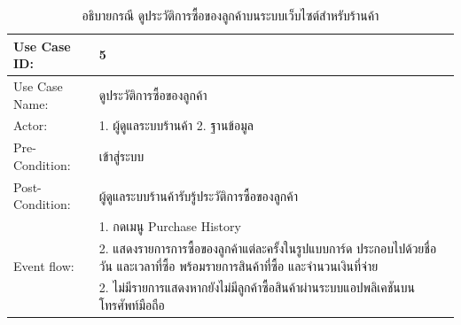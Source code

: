 \begin{table}[htbp]
  \centering
  \caption{อธิบายกรณี ดูประวัติการซื้อของลูกค้าบนระบบเว็บไซต์สำหรับร้านค้า}
  \begin{tabularx}{\textwidth}{|p{3cm}|X|}
    \hline
    \multirow{1}{3cm}{Use Case ID:}      & 5                                                                                                        \\
    \hline
    \multirow{1}{3cm}{Use Case Name:}    & ดูประวัติการซื้อของลูกค้า                                                                                       \\
    \hline
    \multirow{1}{3cm}{Actor:}            & 1. ผู้ดูแลระบบร้านค้า  2. ฐานข้อมูล                                                                             \\
    \hline
    \multirow{1}{3cm}{Pre-Condition:}    & เข้าสู่ระบบ                                                                                                 \\
    \hline
    \multirow{1}{3cm}{Post-Condition:}   & ผู้ดูแลระบบร้านค้ารับรู้ประวัติการซื้อของลูกค้า                                                                        \\
    \hline
    \multirow{3}{3cm}{Event flow:}       & 1. กดเมนู Purchase History                                                                                \\
                                         & 2. แสดงรายการการซื้อของลูกค้าแต่ละครั้งในรูปแบบการ์ด ประกอบไปด้วยชื่อ วัน และเวลาที่ซื้อ พร้อมรายการสินค้าที่ซื้อ และจำนวนเงินที่จ่าย \\
    \hline
    \multirow{1}{3cm}{Alternative flow:} & 2. ไม่มีรายการแสดงหากยังไม่มีลูกค้าซื้อสินค้าผ่านระบบแอปพลิเคชันบนโทรศัพท์มือถือ                                           \\
    \hline
  \end{tabularx}
\end{table}

